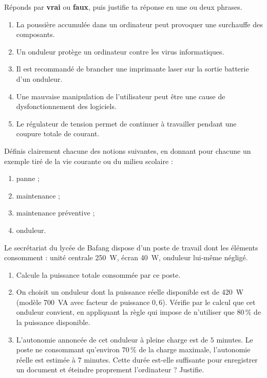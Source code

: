 \documentclass[11pt]{article}
\begin{document}
\begin{exercice}
Réponds par \textbf{vrai} ou \textbf{faux}, puis justifie ta réponse en une ou deux phrases.
\begin{enumerate}
\item La poussière accumulée dans un ordinateur peut provoquer une surchauffe des composants.
\item Un onduleur protège un ordinateur contre les virus informatiques.
\item Il est recommandé de brancher une imprimante laser sur la sortie batterie d'un onduleur.
\item Une mauvaise manipulation de l'utilisateur peut être une cause de dysfonctionnement des logiciels.
\item Le régulateur de tension permet de continuer à travailler pendant une coupure totale de courant.
\end{enumerate}
\end{exercice}

\begin{exercice}[Définitions]
Définis clairement chacune des notions suivantes, en donnant pour chacune un exemple tiré de la vie courante ou du milieu scolaire :
\begin{enumerate}
\item panne ;
\item maintenance ;
\item maintenance préventive ;
\item onduleur.
\end{enumerate}
\end{exercice}

\begin{exercice}
Le secrétariat du lycée de Bafang dispose d'un poste de travail dont les éléments consomment : unité centrale \SI{250}{W}, écran \SI{40}{W}, onduleur lui-même négligé.
\begin{enumerate}
\item Calcule la puissance totale consommée par ce poste.
\item On choisit un onduleur dont la puissance réelle disponible est de \SI{420}{W} (modèle \SI{700}{VA} avec facteur de puissance $0{,}6$). Vérifie par le calcul que cet onduleur convient, en appliquant la règle qui impose de n'utiliser que $80\,\%$ de la puissance disponible.
\item L'autonomie annoncée de cet onduleur à pleine charge est de $5$ minutes. Le poste ne consommant qu'environ $70\,\%$ de la charge maximale, l'autonomie réelle est estimée à $7$ minutes. Cette durée est-elle suffisante pour enregistrer un document et éteindre proprement l'ordinateur ? Justifie.
\end{enumerate}
\end{exercice}
\end{document}
